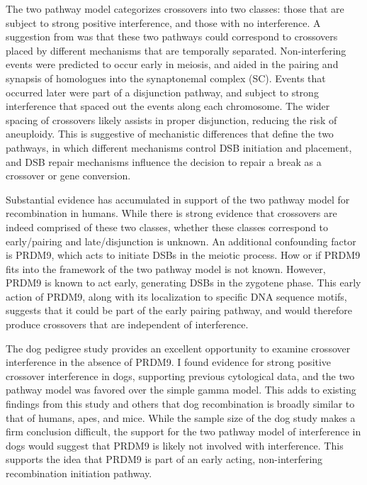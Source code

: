 The two pathway model categorizes crossovers into two classes: those that are subject to strong positive interference, and those with no interference.
A suggestion from \citet{Housworth2003} was that these two pathways could correspond to crossovers placed by different mechanisms that are temporally separated.
Non-interfering events were predicted to occur early in meiosis, and aided in the pairing and synapsis of homologues into the synaptonemal complex (SC).
Events that occurred later were part of a disjunction pathway, and subject to strong interference that spaced out the events along each chromosome.
The wider spacing of crossovers likely assists in proper disjunction, reducing the risk of aneuploidy.
This is suggestive of mechanistic differences that define the two pathways, in which different mechanisms
control DSB initiation and placement, and DSB repair mechanisms influence the decision to repair a break as a crossover or gene conversion\cite{Baudat2007,Berchowitz2010,Stahl2010}.

Substantial evidence has accumulated in support of the two pathway model for recombination in humans\cite{Housworth2003,Fledel-Alon2009,Campbell2015}.
While there is strong evidence that crossovers are indeed comprised of these two classes, whether these classes correspond to early/pairing and late/disjunction is unknown.
An additional confounding factor is PRDM9, which acts to initiate DSBs in the meiotic process.
How or if PRDM9 fits into the framework of the two pathway model is not known.
However, PRDM9 is known to act early, generating DSBs in the zygotene phase\cite{Hayashi2005}.
This early action of PRDM9, along with its localization to specific DNA sequence motifs, suggests that it could be part of the early pairing pathway, and would therefore produce crossovers that are independent of interference.

The dog pedigree study provides an excellent opportunity to examine crossover interference in the absence of PRDM9.
I found evidence for strong positive crossover interference in dogs, supporting previous cytological data\cite{Basheva2008}, and the two pathway model was favored over the simple gamma model.
This adds to existing findings from this study and others\cite{Axelsson2012,Auton2013,Wong2010} that dog recombination is broadly similar to that of humans, apes, and mice.
While the sample size of the dog study makes a firm conclusion difficult, 
the support for the two pathway model of interference in dogs would suggest that PRDM9 is likely not involved with interference.
This supports the idea that PRDM9 is part of an early acting, non-interfering recombination initiation pathway.



